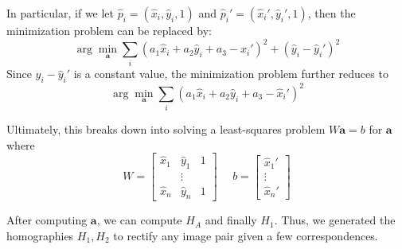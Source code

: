 \documentclass[a4paper, 12pt]{article}
\begin{document}
In particular, if we let $\hat{p}_i = (\hat{x}_i, \hat{y}_i, 1)$ and $\hat{p}_i' = (\hat{x}_i', \hat{y}_i', 1)$, then the minimization problem can be replaced by:
\begin{equation}
\arg \min_{\mathbf{a}} \sum_i (a_1\hat{x}_i + a_2\hat{y}_i + a_3 - \hat{x}_i')^2 + (\hat{y}_i -\hat{y}_i')^2 
\end{equation}
Since $\hat{y}_i -\hat{y}_i'$ is a constant value, the minimization problem further reduces to
\begin{equation}
\arg \min_{\mathbf{a}} \sum_i (a_1\hat{x}_i + a_2\hat{y}_i + a_3 - \hat{x}_i')^2
\end{equation}

Ultimately, this breaks down into solving a least-squares problem $W\mathbf{a} = b$ for $\mathbf{a}$ where
\begin{equation}
W = \begin{bmatrix} \hat{x}_1 & \hat{y}_1 & 1 \\ &\vdots& \\ \hat{x}_n & \hat{y}_n & 1 \end{bmatrix} \ \ \ \ \ \ b = \begin{bmatrix}\hat{x}_1' \\ \vdots \\ \hat{x}_n'\end{bmatrix}
\end{equation}

After computing $\mathbf{a}$, we can compute $H_A$ and finally $H_1$. Thus, we generated the homographies $H_1,H_2$ to rectify any image pair given a few correspondences.
\end{document}
